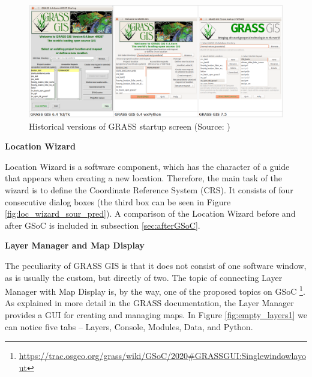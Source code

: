 \documentclass[a4paper,10pt,twoside]{article}
\begin{document}
\vspace{0.3cm}
\begin{figure}[hbt!]
\begin{center}
\includegraphics[width=17cm]{../pictures/verze_startup.png} 
\caption[Historical versions of GRASS startup screen]{Historical versions of GRASS startup screen (Source: \cite{intro})}
\label{fig:verze_startup}
\end{center}
\end{figure}

\bigskip
\noindent \textbf {Location Wizard}

\noindent Location Wizard is a software component, which has the
character of a guide that appears when creating a new
location. Therefore, the main task of the wizard is to define the
Coordinate Reference System (CRS). It consists of four consecutive
dialog boxes (the third box can be seen in Figure \ref{fig:loc_wizard_sour_pred}). A comparison of the Location Wizard before and after
GSoC is included in subsection \ref{sec:afterGSoC}.

\bigskip
\noindent \textbf {Layer Manager and Map Display}

\noindent The peculiarity of GRASS GIS is that it does not consist of
one software window, as is usually the custom, but directly of
two. The topic of connecting Layer Manager with Map Display is, by the
way, one of the proposed topics on GSoC
\footnote{\url{https://trac.osgeo.org/grass/wiki/GSoC/2020\#GRASSGUI:Singlewindowlayout}}.
As explained in more detail in the GRASS documentation, the
Layer Manager provides a GUI for creating and managing maps. In Figure
\ref{fig:empty_layers1} we can notice five tabs -- Layers, Console,
Modules, Data, and Python.
\end{document}
